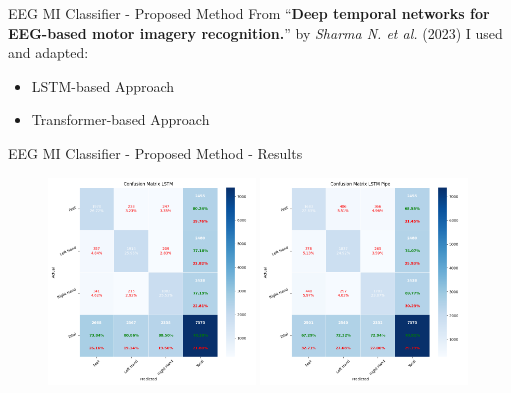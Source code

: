 \begin{frame}{EEG MI Classifier - Proposed Method}
    From ``\textbf{Deep temporal networks for EEG-based motor imagery recognition.}'' by \textit{Sharma N. et al.} (2023) I used and adapted: 
    \begin{itemize}
        \item LSTM-based Approach
        \item Transformer-based Approach
    \end{itemize}
\end{frame}
\begin{frame}{EEG MI Classifier - Proposed Method - Results}
    \begin{figure}[htpb!]
        \centering
        \includegraphics[width=0.49\textwidth]{figures/classification/confusion_matrix_lstm}
        \includegraphics[width=0.49\textwidth]{figures/classification/confusion_matrix_lstm_pipe}
    \end{figure}
\end{frame}

